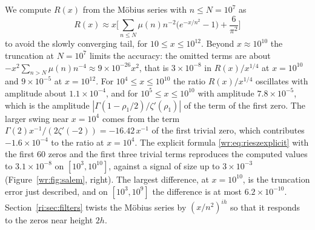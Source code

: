 We compute $R(x)$ from the M\"obius series with $n\le N=10^7$ as
\[
R(x)\approx x\Big[\sum_{n\le N}\mu(n)n^{-2}\big(e^{-x/n^2}-1\big)+\frac6{\pi^2}\Big]
\]
to avoid the slowly converging tail, for $10\le x\le10^{12}$. Beyond $x\approx10^{10}$ the truncation at $N=10^7$ limits the accuracy: the omitted terms are about $-x^2\sum_{n>N}\mu(n)n^{-4}\approx9\times10^{-26}x^2$, that is $3\times10^{-8}$ in $R(x)/x^{1/4}$ at $x=10^{10}$ and $9\times10^{-5}$ at $x=10^{12}$. For $10^4\le x\le10^{10}$ the ratio $R(x)/x^{1/4}$ oscillates with amplitude about $1.1\times10^{-4}$, and for $10^5\le x\le10^{10}$ with amplitude $7.8\times10^{-5}$, which is the amplitude $|\Gamma(1-\rho_1/2)/\zeta'(\rho_1)|$ of the term of the first zero. The larger swing near $x=10^4$ comes from the term $\Gamma(2)x^{-1}/(2\zeta'(-2))=-16.42\,x^{-1}$ of the first trivial zero, which contributes $-1.6\times10^{-4}$ to the ratio at $x=10^4$. The explicit formula \eqref{wr:eq:rieszexplicit} with the first $60$ zeros and the first three trivial terms reproduces the computed values to $3.1\times10^{-8}$ on $[10^3,10^{10}]$, against a signal of size up to $3\times10^{-3}$ (Figure~\ref{wr:fig:salem}, right). The largest difference, at $x=10^{10}$, is the truncation error just described, and on $[10^3,10^9]$ the difference is at most $6.2\times10^{-10}$. Section~\ref{ri:sec:filters} twists the M\"obius series by $(x/n^2)^{ih}$ so that it responds to the zeros near height $2h$.

